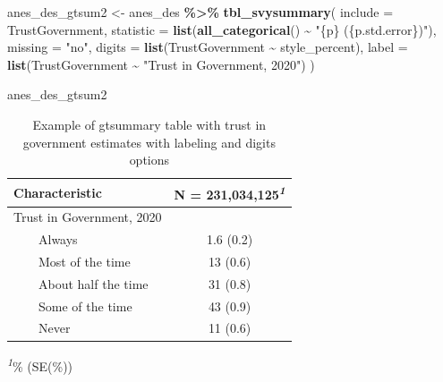 \documentclass[
]{krantz}
\makeatletter
\newenvironment{Shaded}{\begin{snugshade}}{\end{snugshade}}
\newcommand{\AttributeTok}[1]{\textcolor[rgb]{0.27,0.27,0.27}{#1}}
\newcommand{\FunctionTok}[1]{\textcolor[rgb]{0.27,0.27,0.27}{\textbf{#1}}}
\newcommand{\NormalTok}[1]{#1}
\newcommand{\OtherTok}[1]{\textcolor[rgb]{0.37,0.37,0.37}{#1}}
\newcommand{\SpecialCharTok}[1]{\textcolor[rgb]{0.43,0.43,0.43}{\textbf{#1}}}
\newcommand{\StringTok}[1]{\textcolor[rgb]{0.5,0.5,0.5}{#1}}
\newenvironment{kframe}{%
\medskip{}
\setlength{\fboxsep}{.8em}
 \def\at@end@of@kframe{}%
 \ifinner\ifhmode%
  \def\at@end@of@kframe{\end{minipage}}%
  \begin{minipage}{\columnwidth}%
 \fi\fi%
 \def\FrameCommand##1{\hskip\@totalleftmargin \hskip-\fboxsep
 \colorbox{shadecolor}{##1}\hskip-\fboxsep
     \hskip-\linewidth \hskip-\@totalleftmargin \hskip\columnwidth}%
 \MakeFramed {\advance\hsize-\width
   \@totalleftmargin\z@ \linewidth\hsize
   \@setminipage}}%
 {\par\unskip\endMakeFramed%
 \at@end@of@kframe}
\renewenvironment{Shaded}{\begin{kframe}}{\end{kframe}}
\makeatother
\begin{document}
\begin{Shaded}
\begin{Highlighting}[]
\NormalTok{anes\_des\_gtsum2 }\OtherTok{\textless{}{-}}\NormalTok{ anes\_des }\SpecialCharTok{\%\textgreater{}\%}
  \FunctionTok{tbl\_svysummary}\NormalTok{(}
    \AttributeTok{include =}\NormalTok{ TrustGovernment,}
    \AttributeTok{statistic =} \FunctionTok{list}\NormalTok{(}\FunctionTok{all\_categorical}\NormalTok{() }\SpecialCharTok{\textasciitilde{}} \StringTok{"\{p\} (\{p.std.error\})"}\NormalTok{),}
    \AttributeTok{missing =} \StringTok{"no"}\NormalTok{,}
    \AttributeTok{digits =} \FunctionTok{list}\NormalTok{(TrustGovernment }\SpecialCharTok{\textasciitilde{}}\NormalTok{ style\_percent),}
    \AttributeTok{label =} \FunctionTok{list}\NormalTok{(TrustGovernment }\SpecialCharTok{\textasciitilde{}} \StringTok{"Trust in Government, 2020"}\NormalTok{)}
\NormalTok{  )}
\end{Highlighting}
\end{Shaded}

\begin{Shaded}
\begin{Highlighting}[]
\NormalTok{anes\_des\_gtsum2}
\end{Highlighting}
\end{Shaded}



\setlength{\LTpost}{0mm}
\begin{longtable}{lc}
\caption{\label{tab:results-gts-ex-2-tab}Example of gtsummary table with trust in government estimates with labeling and digits options}\\
\toprule
\textbf{Characteristic} & \textbf{N = 231,034,125}\textsuperscript{\textit{1}} \\ 
\midrule
Trust in Government, 2020 &  \\ 
    Always & 1.6 (0.2) \\ 
    Most of the time & 13 (0.6) \\ 
    About half the time & 31 (0.8) \\ 
    Some of the time & 43 (0.9) \\ 
    Never & 11 (0.6) \\ 
\bottomrule
\end{longtable}
\begin{minipage}{\linewidth}
\textsuperscript{\textit{1}}\% (SE(\%))\\
\end{minipage}
\end{document}
